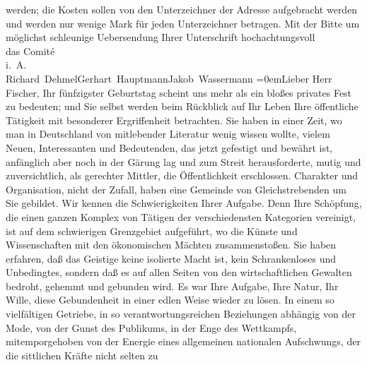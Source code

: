 \begin{ledgroupsized}[t]{13cm}
               werden; die Kosten sollen von den Unterzeichner der Adresse aufgebracht werden und
               werden nur wenige Mark für jeden Unterzeichner betragen.\pend
           \pstart
           Mit der Bitte um möglichst schleunige Uebersendung Ihrer Unterschrift\pend
           \pstart
           hochachtungsvoll{\\[\baselineskip]}das Comité{\\[\baselineskip]}i. A.{\\[\baselineskip]}\spacefill\mbox{Richard Dehmel\hspace*{1.5em}Gerhart Hauptmann\hspace*{1.5em}Jakob Wassermann}\pend
           \leftskip=0em{}\pstart{}{\pb}Lieber Herr Fischer,\pend\pstart
           Ihr fünfzigster Geburtstag scheint uns mehr als ein bloßes privates Fest zu bedeuten;
               und Sie selbst werden beim Rückblick auf Ihr Leben Ihre öffentliche Tätigkeit mit
               besonderer Ergriffenheit betrachten. Sie haben in einer Zeit, wo man in Deutschland von mitlebender Literatur wenig wissen
               wollte, vielem Neuen, Interessanten und Bedeutenden, das jetzt gefestigt und bewährt
               ist, anfänglich aber noch in der Gärung lag und zum Streit herausforderte, mutig und
               zuversichtlich, als gerechter Mittler, die Öffentlichkeit erschlossen. Charakter und
               Organisation, nicht der Zufall, haben eine Gemeinde von Gleichstrebenden um Sie
               gebildet. Wir kennen die Schwierigkeiten Ihrer Aufgabe. Denn Ihre Schöpfung, die
               einen ganzen Komplex von Tätigen der verschiedensten Kategorien vereinigt, ist auf
               dem schwierigen Grenzgebiet aufgeführt, wo die Künste und Wissenschaften mit den
               ökonomischen Mächten zusammenstoßen. Sie haben erfahren, daß das Geistige keine
               isolierte Macht ist, kein Schrankenloses und Unbedingtes, sondern daß es auf allen
               Seiten von den wirtschaftlichen Gewalten bedroht, gehemmt und gebunden wird. Es war
               Ihre Aufgabe, Ihre Natur, Ihr Wille, {\pb}diese Gebundenheit in einer edlen Weise wieder zu lösen. In einem so vielfältigen
               Getriebe, in so verantwortungsreichen Beziehungen abhängig von der Mode, von der
               Gunst des Publikums, in der Enge des Wettkampfs, mitemporgehoben von der Energie
               eines allgemeinen nationalen Aufschwungs, der die sittlichen Kräfte nicht selten zu

\end{ledgroupsized}
